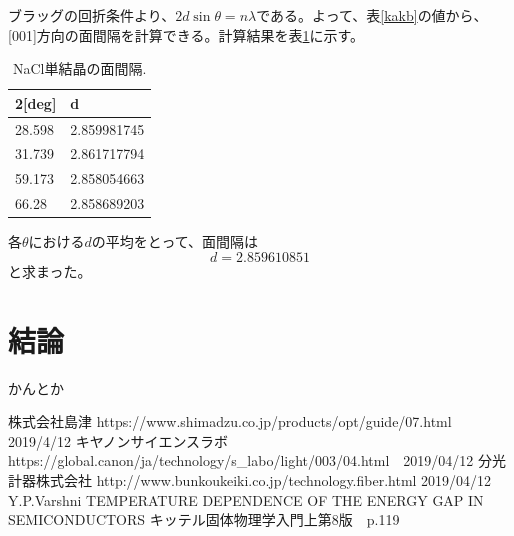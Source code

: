 \documentclass[11pt,a4j,uplatex]{jsarticle}
\begin{document}
\newpage

ブラッグの回折条件より、$2d\sin\theta=n\lambda$である。よって、表\ref{kakb}の値から、[001]方向の面間隔を計算できる。計算結果を表\ref{d}に示す。%

\begin{table}[htbp]
 \begin{center}
  \caption{NaCl単結晶の面間隔.}
  \begin{tabular}{|l|l|}  \hline
   2[deg] & d           \\  \hline  \hline
   28.598 & 2.859981745 \\
   31.739 & 2.861717794 \\
   59.173 & 2.858054663 \\
   66.28  & 2.858689203 \\ \hline
  \end{tabular}
  \label{d}
 \end{center}
\end{table}

各$\theta$における$d$の平均をとって、面間隔は
\begin{equation}
 d=2.859610851
 \label{fin}
\end{equation}
と求まった。

\section{結論}
かんとか

\newpage
\begin{thebibliography}{9}
 株式会社島津 https://www.shimadzu.co.jp/products/opt/guide/07.html 2019/4/12
  キヤノンサイエンスラボ https://global.canon/ja/technology/s\_labo/light/003/04.html　2019/04/12
  分光計器株式会社 http://www.bunkoukeiki.co.jp/technology.fiber.html 2019/04/12
 Y.P.Varshni TEMPERATURE DEPENDENCE OF THE ENERGY GAP IN SEMICONDUCTORS
 キッテル固体物理学入門上第8版　p.119


\end{thebibliography}
\end{document}
